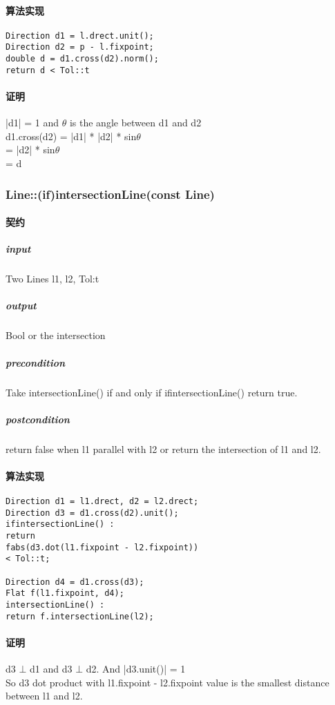 \documentclass[a4paper]{book}
\numberwithin{equation}{chapter}
\theoremstyle{definition}
\begin{document}
\begin{multicols}{2}
\paragraph{算法实现}
\begin{lstlisting}
Direction d1 = l.drect.unit();
Direction d2 = p - l.fixpoint;
double d = d1.cross(d2).norm();
return d < Tol::t
\end{lstlisting}
\paragraph{证明}
|d1| = 1 and $ \theta $ is the angle between d1 and d2\\
d1.cross(d2) = |d1| * |d2| * sin$ \theta $ \\
= |d2| * sin$ \theta $ \\
= d
\subsubsection{Line::(if)intersectionLine(const Line)}
\paragraph{契约}
\subparagraph{input}
Two Lines l1, l2, Tol:t
\subparagraph{output}
Bool or the intersection
\subparagraph{precondition}
Take intersectionLine() if and only if ifintersectionLine() return true.
\subparagraph{postcondition}
return false when l1 parallel with l2 or return the intersection of l1 and l2.
\paragraph{算法实现}
\begin{lstlisting}
Direction d1 = l1.drect, d2 = l2.drect;
Direction d3 = d1.cross(d2).unit();
ifintersectionLine() : 
return 
fabs(d3.dot(l1.fixpoint - l2.fixpoint)) 
< Tol::t;

Direction d4 = d1.cross(d3);
Flat f(l1.fixpoint, d4);
intersectionLine() : 
return f.intersectionLine(l2);

\end{lstlisting}
\paragraph{证明}
d3 $ \bot $ d1 and d3 $ \bot $ d2. And |d3.unit()| = 1\\

So d3 dot product with l1.fixpoint - l2.fixpoint value is the smallest distance between l1 and l2. \\


\end{multicols}
\end{document}
